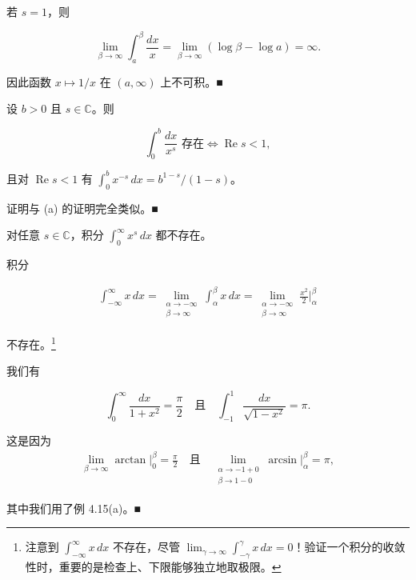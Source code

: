 \begin{example}
\begin{items}
\begin{subitems}
若 $ s = 1 $，则

\[
\lim_{\beta \to \infty} \int_{a}^{\beta} \frac{dx}{x} = \lim_{\beta \to \infty} (\log\beta - \log a) = \infty .
\]

因此函数 $ x \mapsto 1/x $ 在 $ (a, \infty) $ 上不可积。\nobreak\hspace{0.35em}■

\end{subitems}

\item

设 $ b > 0 $ 且 $ s \in \mathbb{C} $。则

\[
\int_{0}^{b} \frac{dx}{x^{s}} \text{ 存在} \Longleftrightarrow \operatorname{Re} s < 1 ,
\]

且对 $ \operatorname{Re} s < 1 $ 有 $ \int_{0}^{b} x^{-s}\,dx = b^{1-s}/(1 - s) $。

\proofhead
证明与 (a) 的证明完全类似。\nobreak\hspace{0.35em}■
\item

对任意 $ s \in \mathbb{C} $，积分 $ \int_{0}^{\infty} x^{s}\,dx $ 都不存在。

\item

积分

\begin{equation*}
\begin{aligned}
\int_{-\infty}^{\infty} x\,dx = \lim_{\substack{\alpha \to -\infty \\ \beta \to \infty}} \int_{\alpha}^{\beta} x\,dx = \lim_{\substack{\alpha \to -\infty \\ \beta \to \infty}} \frac{x^{2}}{2} \Big|_{\alpha}^{\beta}
\end{aligned}
\end{equation*}

不存在。\footnote{注意到 $ \int_{-\infty}^{\infty} x\,dx $ 不存在，尽管 $ \lim_{\gamma \to \infty} \int_{-\gamma}^{\gamma} x\,dx = 0 $！验证一个积分的收敛性时，重要的是检查上、下限能够独立地取极限。}

\item

我们有

\[
\int_{0}^{\infty} \frac{dx}{1 + x^{2}} = \frac{\pi}{2} \quad \text{且} \quad \int_{-1}^{1} \frac{dx}{\sqrt{1 - x^{2}}} = \pi .
\]

\proofhead
这是因为
\begin{equation*}
\begin{aligned}
\lim_{\beta \to \infty} \arctan \Big|_{0}^{\beta} = \frac{\pi}{2} \quad \text{且} \quad \lim_{\substack{\alpha \to -1+0 \\ \beta \to 1-0}} \arcsin \Big|_{\alpha}^{\beta} = \pi ,
\end{aligned}
\end{equation*}

其中我们用了例 4.15(a)。\nobreak\hspace{0.35em}■

\end{items}

\end{example}

